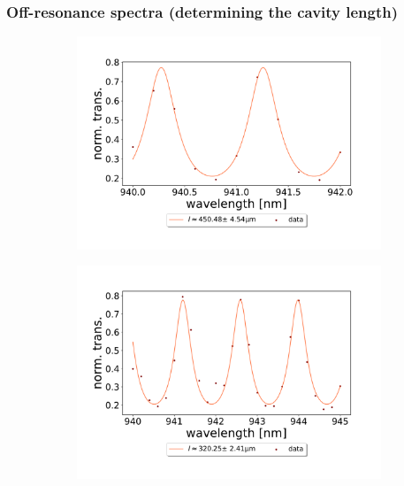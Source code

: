 \subsubsection*{Off-resonance spectra (determining the cavity length)}

\begin{figure}[h!]
    \centering
    \begin{subfigure}[b]{0.49\textwidth}
        \includegraphics[width=\textwidth]{figures/results/double fano fits/20250326/453um_M3:M5_FSR_scan.pdf}
        \caption{}
        \label{fig:453um_M3:M5_FSR_scan}
    \end{subfigure}
    \begin{subfigure}[b]{0.49\textwidth}
        \includegraphics[width=\textwidth]{figures/results/double fano fits/20250326/323um_M3:M5_FSR_scan.pdf}
        \caption{}

\end{subfigure}
\end{figure}
